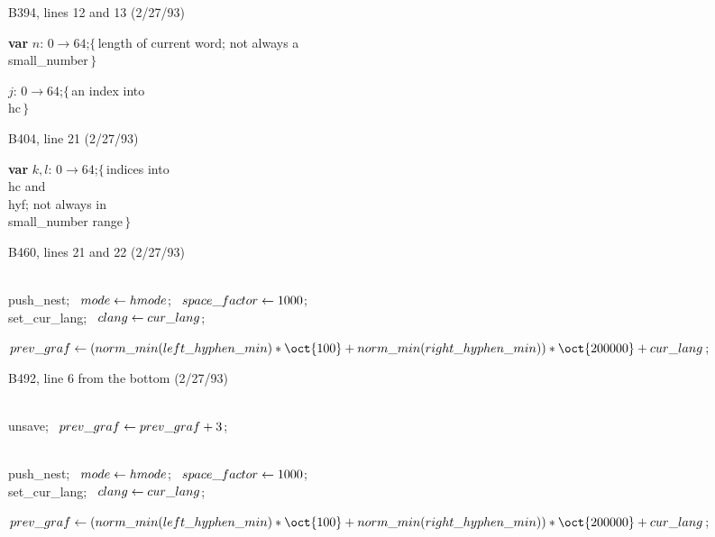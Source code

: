 \bugonpage B394, lines 12 and 13 (2/27/93)

\ninepoint\noindent\hskip10pt
{\bf var} $n$: $0\to64$;\quad$\{\,$length of current word; not always
  a \\{small\_number}$\,\}$\par\noindent\hskip20pt
$j$: $0\to64$;\quad$\{\,$an index into \\{hc}$\,\}$

\bugonpage B404, line 21 (2/27/93)

\ninepoint\noindent\hskip10pt
{\bf var} $k,l$: $0\to64$;\quad$\{\,$indices into \\{hc} and \\{hyf};
                  not always in \\{small\_number} range$\,\}$

\bugonpage B460, lines 21 and 22 (2/27/93)

\ninepoint\noindent\hskip10pt
\\{push\_nest}; \ $\\{mode}\gets\\{hmode}$; \ $\\{space\_factor}\gets1000$; \
 \\{set\_cur\_lang}; \ $\\{clang}\gets\\{cur\_lang}$;\par\noindent\hskip10pt
$\\{prev\_graf}\gets(\\{norm\_min}(\\{left\_hyphen\_min})\ast\oct{100}+
 \\{norm\_min}(\\{right\_hyphen\_min}))\ast\oct{200000}+\\{cur\_lang}$;

\bugonpage B492, line 6 from the bottom (2/27/93)

\ninepoint\noindent\hskip10pt
\\{unsave}; \ $\\{prev\_graf}\gets\\{prev\_graf}+3$;\par\noindent\hskip10pt
\\{push\_nest}; \ $\\{mode}\gets\\{hmode}$; \ $\\{space\_factor}\gets1000$; \
 \\{set\_cur\_lang}; \ $\\{clang}\gets\\{cur\_lang}$;\par\noindent\hskip10pt
$\\{prev\_graf}\gets(\\{norm\_min}(\\{left\_hyphen\_min})\ast\oct{100}+
 \\{norm\_min}(\\{right\_hyphen\_min}))\ast\oct{200000}+\\{cur\_lang}$;

